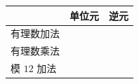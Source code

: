 \documentclass[11pt]{ctexart}
\begin{document}
\begin{center}
\begin{tabular}{@{}lcc@{}}
  \toprule
   & \textbf{单位元} & \textbf{逆元} \\
  \midrule
  \rule{0pt}{2.6ex}有理数加法 & \hspace{2.6em} & \hspace{4.6em} \\
  \rule{0pt}{2.6ex}有理数乘法 & \hspace{2.6em} & \hspace{4.6em} \\
  \rule{0pt}{2.6ex}模 \(12\) 加法 & \hspace{2.6em} & \hspace{4.6em} \\
  \bottomrule
\end{tabular}
\end{center}
\end{document}
